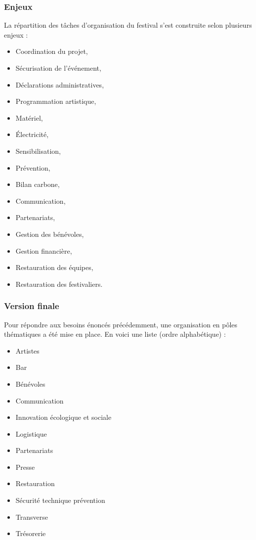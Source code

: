 \documentclass[12pt,a4paper]{report}
\begin{document}
\subsubsection{Enjeux}
La répartition des tâches d'organisation du festival s'est construite selon plusieurs enjeux :
\begin{itemize}
\item Coordination du projet,
\item Sécurisation de l'événement,
\item Déclarations administratives,
\item Programmation artistique,
\item Matériel,
\item Électricité,
\item Sensibilisation,
\item Prévention,
\item Bilan carbone,
\item Communication,
\item Partenariats,
\item Gestion des bénévoles,
\item Gestion financière,
\item Restauration des équipes,
\item Restauration des festivaliers. \\
\end{itemize}

\subsubsection{Version finale}
Pour répondre aux besoins énoncés précédemment, une organisation en pôles thématiques a été mise en place. En voici une liste (ordre alphabétique) : 
\begin{itemize}
\item Artistes
\item Bar
\item Bénévoles
\item Communication
\item Innovation écologique et sociale
\item Logistique
\item Partenariats
\item Presse
\item Restauration
\item Sécurité technique prévention
\item Transverse
\item Trésorerie
\end{itemize}
\end{document}
